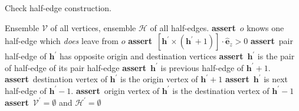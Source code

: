 \documentclass[aps, superscriptaddress, notitlepage]{revtex4-1}
\providecommand\ASSERT{\STATE\textbf{assert}~}
\begin{document}
\begin{algorithm}[!t]
\caption{Check half-edge construction.}
\label{alg:check}
\begin{algorithmic}[1]
\REQUIRE Ensemble $\mathcal{V}$ of all vertices, ensemble $\mathcal{H}$ of all half-edges.
     
    \ENDIF
     
     
         
            \ASSERT $o$ knows one half-edge which \textit{does} leave from $o$
        \ENDIF
        \ASSERT $[\boldsymbol{h}^{\prime} \times (\boldsymbol{h}^{\prime} + 1)] \cdot \hat{\boldsymbol{e}}_z > 0$ 
        \ASSERT pair half-edge of $\boldsymbol{h}^{\prime}$ has opposite origin and destination vertices 
        \ASSERT $\boldsymbol{h}^{\prime}$ is the pair of half-edge of its pair half-edge
        \ASSERT $\boldsymbol{h}^{\prime}$ is previous half-edge of $\boldsymbol{h}^{\prime} + 1$. 
        \ASSERT destination vertex of $\boldsymbol{h}^{\prime}$ is the origin vertex of $\boldsymbol{h}^{\prime} + 1$
        \ASSERT $\boldsymbol{h}^{\prime}$ is next half-edge of $\boldsymbol{h}^{\prime} - 1$. 
        \ASSERT origin vertex of $\boldsymbol{h}^{\prime}$ is the destination vertex of $\boldsymbol{h}^{\prime} - 1$
    \ENDFOR
\ENDFOR
\ASSERT $\mathcal{V}^{\prime} = \emptyset$ and $\mathcal{H}^{\prime} = \emptyset$
\end{algorithmic}
\end{algorithm}
\end{document}
